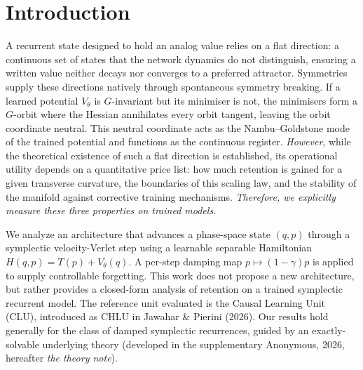 \documentclass{article}
\begin{document}
\section{Introduction}\label{sec:intro}

A recurrent state designed to hold an analog value relies on a flat direction: a continuous set of states that the network dynamics do not distinguish, ensuring a written value neither decays nor converges to a preferred attractor. Symmetries supply these directions natively through spontaneous symmetry breaking. If a learned potential $V_\theta$ is $G$-invariant but its minimiser is not, the minimisers form a $G$-orbit where the Hessian annihilates every orbit tangent, leaving the orbit coordinate neutral. This neutral coordinate acts as the Nambu--Goldstone mode of the trained potential and functions as the continuous register. \emph{However}, while the theoretical existence of such a flat direction is established, its operational utility depends on a quantitative price list: how much retention is gained for a given transverse curvature, the boundaries of this scaling law, and the stability of the manifold against corrective training mechanisms. \emph{Therefore, we explicitly measure these three properties on trained models.}

We analyze an architecture that advances a phase-space state $(q,p)$ through a symplectic velocity-Verlet step using a learnable separable Hamiltonian $H(q,p)=T(p)+V_\theta(q)$. A per-step damping map $p\mapsto(1-\gamma)p$ is applied to supply controllable forgetting. This work does not propose a new architecture, but rather provides a closed-form analysis of retention on a trained symplectic recurrent model. The reference unit evaluated is the Causal Learning Unit (CLU), introduced as CHLU in Jawahar \& Pierini (2026). Our results hold generally for the class of damped symplectic recurrences, guided by an exactly-solvable underlying theory (developed in the supplementary Anonymous, 2026, hereafter \emph{the theory note}).
\end{document}
